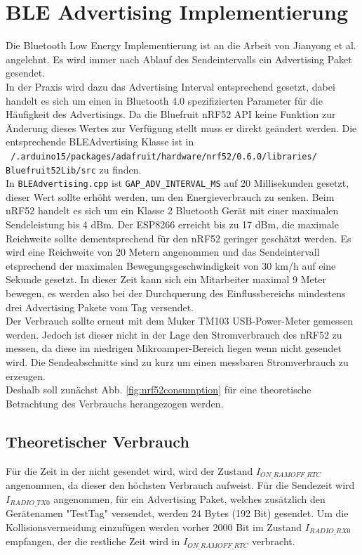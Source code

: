 \section{BLE Advertising Implementierung}
Die Bluetooth Low Energy Implementierung ist an die Arbeit von Jianyong et al. angelehnt.
Es wird immer nach Ablauf des Sendeintervalls ein Advertising Paket gesendet.\\
In der Praxis wird dazu das Advertising Interval entsprechend gesetzt, dabei handelt es sich um einen in Bluetooth 4.0 spezifizierten Parameter für die Häufigkeit des Advertisings.
Da die Bluefruit nRF52 API keine Funktion zur Änderung dieses Wertes zur Verfügung stellt muss er direkt geändert werden.
Die entsprechende BLEAdvertising Klasse ist in \\\texttt{~/.arduino15/packages/adafruit/hardware/nrf52/0.6.0/libraries/}\\\texttt{Bluefruit52Lib/src} zu finden. \\
In \texttt{BLEAdvertising.cpp} ist \texttt{GAP\_ADV\_INTERVAL\_MS} auf 20 Millisekunden gesetzt, dieser Wert sollte erhöht werden, um den Energieverbrauch zu senken.
Beim nRF52 handelt es sich um ein Klasse 2 Bluetooth Gerät mit einer maximalen Sendeleistung bis 4 dBm.
Der ESP8266 erreicht bis zu 17 dBm, die maximale Reichweite sollte dementsprechend für den nRF52 geringer geschätzt werden.
Es wird eine Reichweite von 20 Metern angenommen und das Sendeintervall etsprechend der maximalen Bewegungsgeschwindigkeit von 30 km/h auf eine Sekunde gesetzt. 
In dieser Zeit kann sich ein Mitarbeiter maximal 9 Meter bewegen, es werden also bei der Durchquerung des Einflussbereichs mindestens drei Advertising Pakete vom Tag versendet.\\
Der Verbrauch sollte erneut mit dem Muker TM103 USB-Power-Meter gemessen werden.
Jedoch ist dieser nicht in der Lage den Stromverbrauch des nRF52 zu messen, da diese im niedrigen Mikroamper-Bereich liegen wenn nicht gesendet wird.
Die Sendeabschnitte sind zu kurz um einen messbaren Stromverbrauch zu erzeugen.\\
Deshalb soll zunächst Abb. \ref{fig:nrf52consumption} für eine theoretische Betrachtung des Verbrauchs herangezogen werden. 

\subsection{Theoretischer Verbrauch}
Für die Zeit in der nicht gesendet wird, wird der Zustand $I_{ON\_RAMOFF\_RTC}$ angenommen, da dieser den höchsten Verbrauch aufweist.
Für die Sendezeit wird $I_{RADIO\_TX0}$ angenommen, für ein Advertising Paket, welches zusätzlich den Gerätenamen "TestTag" versendet, werden 24 Bytes (192 Bit) gesendet.
Um die Kollisionsvermeidung einzufügen werden vorher 2000 Bit im Zustand $I_{RADIO\_RX0}$ empfangen, der die restliche Zeit wird in $I_{ON\_RAMOFF\_RTC}$ verbracht. \\[1cm]

